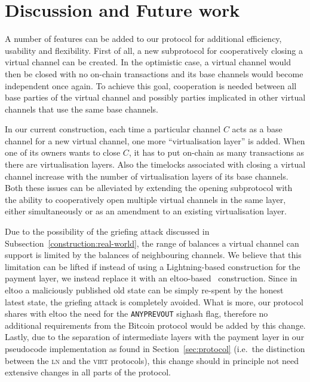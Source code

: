 \section{Discussion and Future work}
  A number of features can be added to our protocol for additional efficiency,
  usability and flexibility. First of all, a new subprotocol for cooperatively
  closing a virtual channel can be created. In the optimistic case, a virtual
  channel would then be closed with no on-chain transactions and its base
  channels would become independent once again. To achieve this goal,
  cooperation is needed between all base parties of the virtual channel and
  possibly parties implicated in other virtual channels that use the same base
  channels.

  In our current construction, each time a particular channel $C$ acts as a base
  channel for a new virtual channel, one more ``virtualisation layer'' is added. When
  one of its owners wants to close $C$, it has to put on-chain as many
  transactions as there are virtualisation layers. Also the timelocks associated
  with closing a virtual channel increase with the number of virtualisation
  layers of its base channels. Both these issues can be alleviated by extending
  the opening subprotocol with the ability to cooperatively open multiple
  virtual channels in the same layer, either simultaneously or as an amendment
  to an existing virtualisation layer.

  Due to the possibility of the griefing attack discussed in
  Subsection~\ref{construction:real-world}, the range of balances a virtual
  channel can
  support is limited by the balances of neighbouring channels. We believe that
  this limitation can be lifted if instead of using a Lightning-based
  construction for the payment layer, we instead replace it with an
  eltoo-based~\cite{eltoo} construction. Since in eltoo a maliciously published
  old state can be simply re-spent by the honest latest state, the griefing
  attack is completely avoided. What is more, our protocol shares with eltoo the
  need for the \texttt{ANYPREVOUT} sighash flag, therefore no additional
  requirements from the Bitcoin protocol would be added by this change. Lastly,
  due to the separation of intermediate layers with the payment layer in our
  pseudocode implementation as found in Section~\ref{sec:protocol} (i.e.\ the distinction
  between the \textsc{ln} and the \textsc{virt} protocols), this change should
  in principle not need extensive changes in all parts of the protocol.

